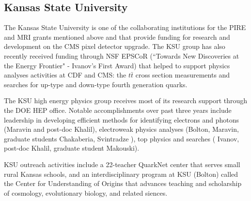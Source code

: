 
\subsection{Kansas State University}


The Kansas State University is one of the collaborating institutions for 
the PIRE and MRI grants
mentioned above and that provide funding for research and development on 
the CMS pixel detector upgrade. 
The KSU group has also recently received funding through NSF EPSCoR 
(``Towards New Discoveries at the Energy Frontier"  - Ivanov's First 
Award) that helped to support 
physics analyses activities at CDF and CMS: the $t\bar{t}$ cross section 
measurements and searches 
for up-type and down-type fourth generation quarks. 

The KSU high energy physics group receives most of its research support 
through the DOE HEP office.
Notable accomplishments over past three years include leadership in 
developing efficient methods 
for identifying electrons and photons (Maravin and post-doc Khalil), 
electroweak 
physics analyses (Bolton, Maravin, graduate students Chakaberia, 
Svintradze ), 
top physics and searches ( Ivanov, post-doc Khalil, graduate student 
Makouski).


KSU outreach activities include a 22-teacher QuarkNet center that serves 
small rural
Kansas schools, and an interdisciplinary program at KSU (Bolton) called 
the Center for Understanding of 
Origins that advances teaching and scholarship of  cosmology, evolutionary 
biology, and related 
siences. 


